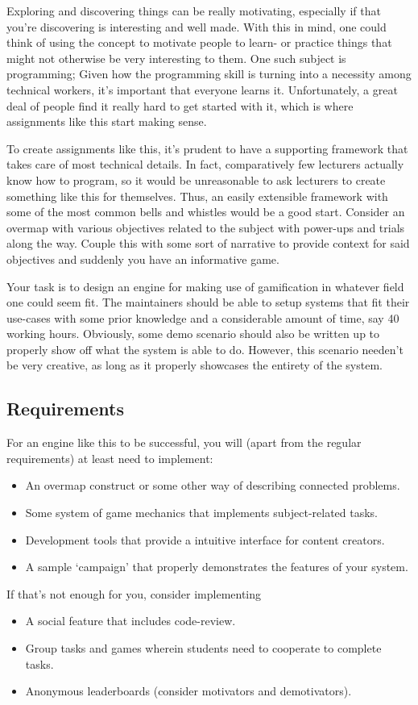 \begin{refsection}
Exploring and discovering things can be really motivating, especially if that you're discovering is interesting and well made. With this in mind, one could think of using the concept to motivate people to learn- or practice things that might not otherwise be very interesting to them. One such subject is programming; Given how the programming skill is turning into a necessity among technical workers, it's important that everyone learns it. Unfortunately, a great deal of people find it really hard to get started with it, which is where assignments like this start making sense.

To create assignments like this, it's prudent to have a supporting framework that takes care of most technical details. In fact, comparatively few lecturers actually know how to program, so it would be unreasonable to ask lecturers to create something like this for themselves. Thus, an easily extensible framework with some of the most common bells and whistles would be a good start. Consider an overmap with various objectives related to the subject with power-ups and trials along the way. Couple this with some sort of narrative to provide context for said objectives and suddenly you have an informative game.

Your task is to design an engine for making use of gamification in whatever field one could seem fit. The maintainers should be able to setup systems that fit their use-cases with some prior knowledge and a considerable amount of time, say 40 working hours. Obviously, some demo scenario should also be written up to properly show off what the system is able to do. However, this scenario needen't be very creative, as long as it properly showcases the entirety of the system.

\subsection*{Requirements}
For an engine like this to be successful, you will (apart from the regular requirements) at least need to implement:
\begin{itemize}
    \item An overmap construct or some other way of describing connected problems.
    \item Some system of game mechanics that implements subject-related tasks.
    \item Development tools that provide a intuitive interface for content creators.
    \item A sample `campaign' that properly demonstrates the features of your system.
\end{itemize}
If that's not enough for you, consider implementing
\begin{itemize}
    \item A social feature that includes code-review.
    \item Group tasks and games wherein students need to cooperate to complete tasks.
    \item Anonymous leaderboards (consider motivators and demotivators).
\end{itemize}

\end{refsection}
